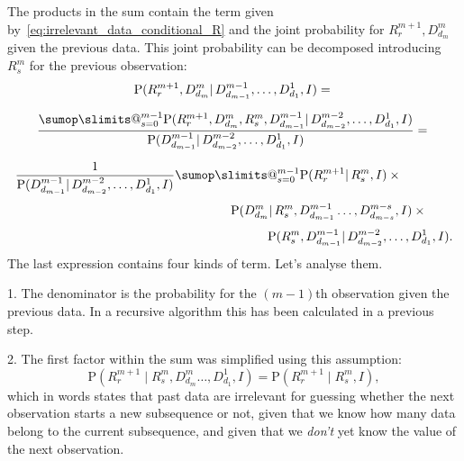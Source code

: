 \documentclass[\ifafour a4paper,12pt,\else a5paper,10pt,\fi%
onecolumn,oneside,article,%
british%
]{memoir}
\makeatletter
\theoremstyle{remark}
\theoremstyle{innote}
\def\sum{\DOTSI\sumop\slimits@}
\newcommand*{\p}{\mathrm{P}}%
\renewcommand*{\|}{\mathpunct{|}}
\newcommand*{\yI}{I}
\makeatother
\begin{document}
The products in the sum contain the term given
by~\eqref{eq:irrelevant_data_conditional_R} and the joint probability for
$R^{m+1}_{r}, D^{m}_{d_{m}}$  given the previous data. This joint probability
 can be decomposed introducing $R^{m}_{s}$ for the previous observation:
\begin{multline}
  \label{eq:prob_R_and_last_decompose}
  \p(R^{m+1}_{r}, D^{m}_{d_{m}} \| D^{m-1}_{d_{m-1}}, \dotsc, D^{1}_{d_{1}}, \yI) 
 ={} \\[2\jot]
  \frac{\sum_{s=0}^{m-1}
    \p(R^{m+1}_{r}, D^{m}_{d_{m}}, R^{m}_{s}, D^{m-1}_{d_{m-1}}
    \| D^{m-2}_{d_{m-2}}, \dotsc, D^{1}_{d_{1}}, \yI)}{
\p(D^{m-1}_{d_{m-1}} \| D^{m-2}_{d_{m-2}}, \dotsc, D^{1}_{d_{1}}, \yI)}
  ={}\\[2\jot]
  \begin{aligned}
    \frac{1}{\p(D^{m-1}_{d_{m-1}} \| D^{m-2}_{d_{m-2}}, \dotsc, D^{1}_{d_{1}}, \yI)}
  \sum_{s=0}^{m-1} \p(R^{m+1}_{r} \| R^{m}_{s}, \yI)
  \times{}\qquad\qquad&\\[\jot]
  \p(D^{m}_{d_{m}} \|
    R^{m}_{s}, D^{m-1}_{d_{m-1}} \dotsc, D^{m-s}_{d_{m-s}}, \yI)
    \times{}\qquad&\\[\jot]
 \p(R^{m}_{s}, D^{m-1}_{d_{m-1}} \|
  D^{m-2}_{d_{m-2}},\dotsc, D^{1}_{d_{1}}, \yI).&
  \end{aligned}
\end{multline}
The last expression contains four kinds of term. Let's analyse them.

1. The denominator is the probability for the $(m-1)$th observation given the
previous data. In a recursive algorithm this has been calculated in a
previous step.

2. The first factor within the sum was simplified using this assumption:
\begin{equation}
  \label{eq:prob_R_and_last_decompose}
  \p(R^{m+1}_{r} \|
  R^{m}_{s},  D^{m}_{d_{m}} \dotsc, D^{1}_{d_{1}}, \yI)
  = \p(R^{m+1}_{r} \|  R^{m}_{s},  \yI),
\end{equation}
which in words states that past data are irrelevant for guessing whether
the next observation starts a new subsequence or not, given that we know
how many data belong to the current subsequence, and given that we
\emph{don't} yet know the value of the next observation.
\end{document}
